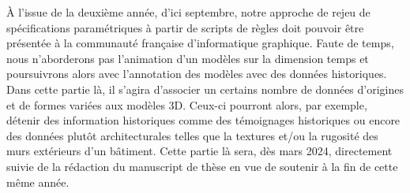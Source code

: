 À l'issue de la deuxième année, d'ici septembre, notre approche de rejeu de
spécifications paramétriques à partir de scripts de règles doit pouvoir être
présentée à la communauté française d'informatique graphique. %
Faute de temps, nous n'aborderons pas l'animation d'un modèles sur la dimension
temps et poursuivrons alors avec l'annotation des modèles avec des données
historiques. %
Dans cette partie là, il s'agira d'associer un certains nombre de données
d'origines et de formes variées aux modèles 3D. %
Ceux-ci pourront alors, par exemple, détenir des information historiques comme
des témoignages historiques ou encore des données plutôt architecturales telles
que la textures et/ou la rugosité des murs extérieurs d'un bâtiment. %
Cette partie là sera, dès mars 2024, directement suivie de la rédaction du
manuscript de thèse en vue de soutenir à la fin de cette même année. %




